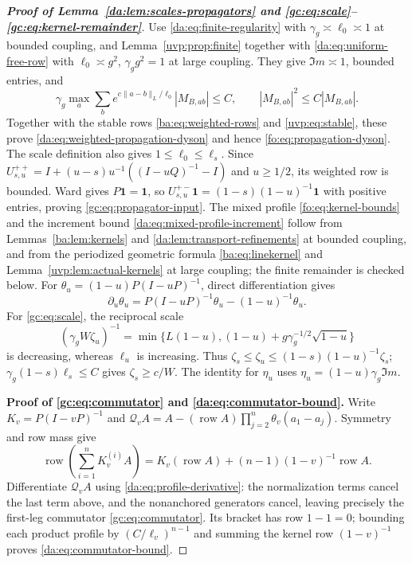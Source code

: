 \documentclass[11pt]{article}
\numberwithin{equation}{section}
\theoremstyle{remark}
\begin{document}
\begin{proof}[\textbf{Proof of Lemma~\ref{da:lem:scales-propagators} and
\eqref{gc:eq:scale}--\eqref{gc:eq:kernel-remainder}}]
Use \eqref{da:eq:finite-regularity} with $\gamma_g\asymp\ell_0\asymp1$
at bounded coupling, and Lemma~\ref{uvp:prop:finite} together with
\eqref{da:eq:uniform-free-row} with
$\ell_0\asymp g^2$, $\gamma_gg^2=1$ at large coupling. They give
$\Im m\asymp1$, bounded entries, and
\[
 \gamma_g\max_a\sum_b e^{c\|a-b\|_L/\ell_0}|M_{B,ab}|\le C,
 \qquad |M_{B,ab}|^2\le C|M_{B,ab}|.
\]
Together with the stable rows \eqref{ba:eq:weighted-rows} and
\eqref{uvp:eq:stable}, these prove
\eqref{da:eq:weighted-propagation-dyson} and hence
\eqref{fo:eq:propagation-dyson}.
The scale definition also gives $1\le\ell_0\le\ell_s$.
Since $U_{s,u}^{++}=I+(u-s)u^{-1}((I-uQ)^{-1}-I)$ and $u\ge1/2$,
its weighted row is bounded. Ward gives $P\mathbf1=\mathbf1$,
so $U_{s,u}^{+-}\mathbf1=(1-s)(1-u)^{-1}\mathbf1$ with positive
entries, proving \eqref{gc:eq:propagator-input}.
The mixed profile \eqref{fo:eq:kernel-bounds} and the increment
bound \eqref{da:eq:mixed-profile-increment} follow from Lemmas~\ref{ba:lem:kernels} and
\ref{da:lem:transport-refinements} at bounded coupling, and from
the periodized geometric formula \eqref{ba:eq:linekernel} and
Lemma~\ref{uvp:lem:actual-kernels} at large coupling; the finite
remainder is checked below.
For $\theta_u=(1-u)P(I-uP)^{-1}$, direct differentiation gives
\begin{equation}\label{da:eq:profile-derivative}
 \partial_u\theta_u=P(I-uP)^{-1}\theta_u-(1-u)^{-1}\theta_u.
\end{equation}
For \eqref{gc:eq:scale}, the reciprocal scale
\[
 (\gamma_gW\zeta_u)^{-1}
 =\min\{L(1-u),(1-u)+g\gamma_g^{-1/2}\sqrt{1-u}\}
\]
is decreasing, whereas $\ell_u$ is increasing. Thus
$\zeta_s\le\zeta_u\le(1-s)(1-u)^{-1}\zeta_s$;
$\gamma_g(1-s)\ell_s\le C$ gives $\zeta_s\ge c/W$.
The identity for $\eta_u$ uses $\eta_u=(1-u)\gamma_g\Im m$.

\noindent\textbf{Proof of \eqref{gc:eq:commutator} and \eqref{da:eq:commutator-bound}.}
Write $K_v=P(I-vP)^{-1}$ and
$\mathcal Q_vA=A-(\operatorname{row}A)\prod_{j=2}^n\theta_v(a_1-a_j)$.
Symmetry and row mass give
\[
 \operatorname{row}\!\left(\sum_{i=1}^nK_v^{(i)}A\right)
 =K_v(\operatorname{row}A)+(n-1)(1-v)^{-1}\operatorname{row}A.
\]
Differentiate $\mathcal Q_vA$ using \eqref{da:eq:profile-derivative}:
the normalization terms cancel the last term above, and the
nonanchored generators cancel, leaving precisely the first-leg
commutator \eqref{gc:eq:commutator}.
Its bracket has row $1-1=0$; bounding each product profile by
$(C/\ell_v)^{n-1}$ and summing the kernel row $(1-v)^{-1}$ proves
\eqref{da:eq:commutator-bound}.


\end{proof}
\end{document}
